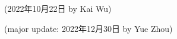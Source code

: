\begin{flushright}
(2022年10月22日 by Kai Wu)

(major update: 2022年12月30日 by Yue Zhou)
\end{flushright}





% 
